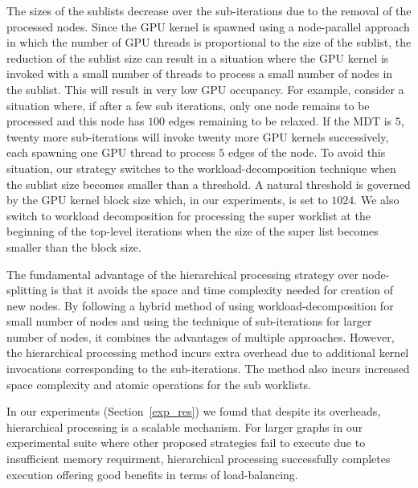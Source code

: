 
The sizes of the sublists decrease over the sub-iterations due to the removal of the processed nodes. 
Since the GPU kernel is spawned using a node-parallel approach in which the number of GPU threads is proportional to the size of the sublist, the reduction of the sublist size can result in a situation where the GPU kernel is invoked with a small number of threads to process a small number of nodes in the sublist. 
This will result in very low GPU occupancy. 
For example, consider a situation where, if after a few sub iterations, only one node remains to be processed and this node has $100$ edges remaining to be relaxed. 
If the MDT is $5$, twenty more sub-iterations will invoke twenty more GPU kernels successively, each spawning one GPU thread to process $5$ edges of the node. 
To avoid this situation, our strategy switches to the workload-decomposition technique when the sublist size becomes smaller than a threshold.
A natural threshold is governed by the GPU kernel block size which, in our experiments, is set to $1024$. 
We also switch to workload decomposition for processing the super worklist at the beginning of the top-level iterations when the size of the super list becomes smaller than the block size.

The fundamental advantage of the hierarchical processing strategy over node-splitting is that it avoids the space and time complexity needed for creation of new nodes. 
By following a hybrid method of using workload-decomposition for small number of nodes and using the technique of sub-iterations for larger number of nodes, it combines the advantages of multiple approaches. 
However, the hierarchical processing method incurs extra overhead due to additional kernel invocations corresponding to the sub-iterations. 
The method also incurs increased space complexity and atomic operations for the sub worklists.

In our experiments (Section~\ref{exp_res}) we found that despite its overheads, hierarchical processing is a scalable mechanism.
For larger graphs in our experimental suite where other proposed strategies fail to execute due to insufficient memory requirment, hierarchical processing
successfully completes execution offering good benefits in terms of load-balancing.

